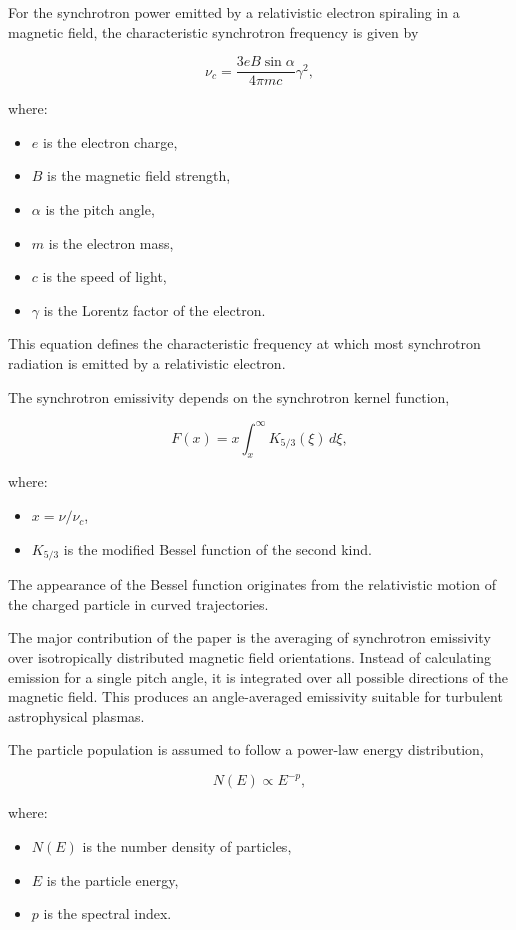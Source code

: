 \documentclass{article}
\begin{document}
For the synchrotron power emitted by a relativistic electron spiraling in a magnetic field, the characteristic synchrotron frequency is given by

\[
\nu_c = \frac{3eB\sin\alpha}{4\pi mc}\gamma^2 ,
\]

where:
\begin{itemize}
    \item \(e\) is the electron charge,
    \item \(B\) is the magnetic field strength,
    \item \(\alpha\) is the pitch angle,
    \item \(m\) is the electron mass,
    \item \(c\) is the speed of light,
    \item \(\gamma\) is the Lorentz factor of the electron.
\end{itemize}

This equation defines the characteristic frequency at which most synchrotron radiation is emitted by a relativistic electron.

The synchrotron emissivity depends on the synchrotron kernel function,

\[
F(x)=x\int_x^\infty K_{5/3}(\xi)\, d\xi ,
\]

where:
\begin{itemize}
    \item \(x=\nu/\nu_c\),
    \item \(K_{5/3}\) is the modified Bessel function of the second kind.
\end{itemize}

The appearance of the Bessel function originates from the relativistic motion of the charged particle in curved trajectories. 

The major contribution of the paper is the averaging of synchrotron emissivity over isotropically distributed magnetic field orientations. Instead of calculating emission for a single pitch angle, it is integrated over all possible directions of the magnetic field. This produces an angle-averaged emissivity suitable for turbulent astrophysical plasmas.

The particle population is assumed to follow a power-law energy distribution,

\[
N(E)\propto E^{-p},
\]

where:
\begin{itemize}
    \item \(N(E)\) is the number density of particles,
    \item \(E\) is the particle energy,
    \item \(p\) is the spectral index.
\end{itemize}
\end{document}

